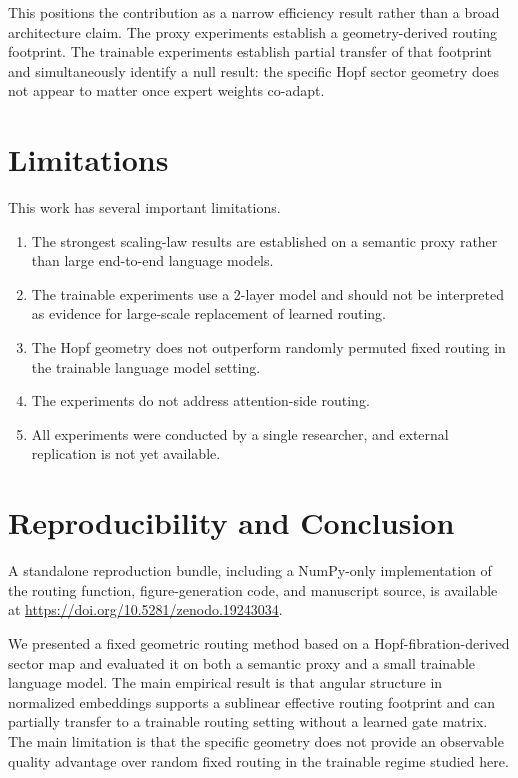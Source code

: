 \documentclass[10pt,twocolumn]{article}
\begin{document}
This positions the contribution as a narrow efficiency result rather than a broad architecture claim. The proxy experiments establish a geometry-derived routing footprint. The trainable experiments establish partial transfer of that footprint and simultaneously identify a null result: the specific Hopf sector geometry does not appear to matter once expert weights co-adapt.

\section{Limitations}
This work has several important limitations.
\begin{enumerate}
    \item The strongest scaling-law results are established on a semantic proxy rather than large end-to-end language models.
    \item The trainable experiments use a 2-layer model and should not be interpreted as evidence for large-scale replacement of learned routing.
    \item The Hopf geometry does not outperform randomly permuted fixed routing in the trainable language model setting.
    \item The experiments do not address attention-side routing.
    \item All experiments were conducted by a single researcher, and external replication is not yet available.
\end{enumerate}

\section{Reproducibility and Conclusion}
A standalone reproduction bundle, including a NumPy-only implementation of the routing function, figure-generation code, and manuscript source, is available at \url{https://doi.org/10.5281/zenodo.19243034}.

We presented a fixed geometric routing method based on a Hopf-fibration-derived sector map and evaluated it on both a semantic proxy and a small trainable language model. The main empirical result is that angular structure in normalized embeddings supports a sublinear effective routing footprint and can partially transfer to a trainable routing setting without a learned gate matrix. The main limitation is that the specific geometry does not provide an observable quality advantage over random fixed routing in the trainable regime studied here.
\end{document}
